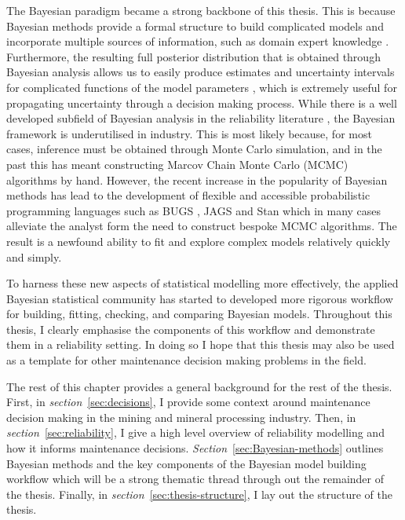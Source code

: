 The Bayesian paradigm became a strong backbone of this thesis. This is because Bayesian methods provide a formal structure to build complicated models and incorporate multiple sources of information, such as domain expert knowledge \citep{meeker2022}. Furthermore, the resulting full posterior distribution that is obtained through Bayesian analysis allows us to easily produce estimates and uncertainty intervals for complicated functions of the model parameters \citep{meeker2022}, which is extremely useful for propagating uncertainty through a decision making process. While there is a well developed subfield of Bayesian analysis in the reliability literature \citep{hamada2008, meeker2022}, the Bayesian framework is underutilised in industry. This is most likely because, for most cases, inference must be obtained through Monte Carlo simulation, and in the past this has meant constructing Marcov Chain Monte Carlo (MCMC) algorithms by hand. However, the recent increase in the popularity of Bayesian methods has lead to the development of flexible and accessible probabilistic programming languages such as BUGS \citep{lunn2012}, JAGS \citep{plummer2003} and Stan \citep{Stan2022} which in many cases alleviate the analyst form the need to construct bespoke MCMC algorithms. The result is a newfound ability to fit and explore complex models relatively quickly and simply.  

To harness these new aspects of statistical modelling more effectively, the applied Bayesian statistical community has started to developed more rigorous workflow for building, fitting, checking, and comparing Bayesian models. Throughout this thesis, I clearly emphasise the components of this workflow and demonstrate them in a reliability setting. In doing so I hope that this thesis may also be used as a template for other maintenance decision making problems in the field.

The rest of this chapter provides a general background for the rest of the thesis. First, in \textit{section}~\ref{sec:decisions}, I provide some context around maintenance decision making in the mining and mineral processing industry. Then, in \textit{section}~\ref{sec:reliability}, I give a high level overview of reliability modelling and how it informs maintenance decisions. \textit{Section}~\ref{sec:Bayesian-methods} outlines Bayesian methods and the key components of the Bayesian model building workflow which will be a strong thematic thread through out the remainder of the thesis. Finally, in \textit{section}~\ref{sec:thesis-structure}, I lay out the structure of the thesis.


